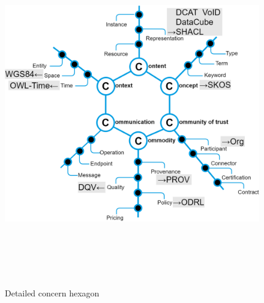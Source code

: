 \begin{figure}[H]
	\begin{Center}
		\includegraphics[width=6.53in,height=5.96in]{./media/image53.png}
		\caption{Detailed concern hexagon}
		\label{fig:Detailed_concern_hexagon}
	\end{Center}
\end{figure}




